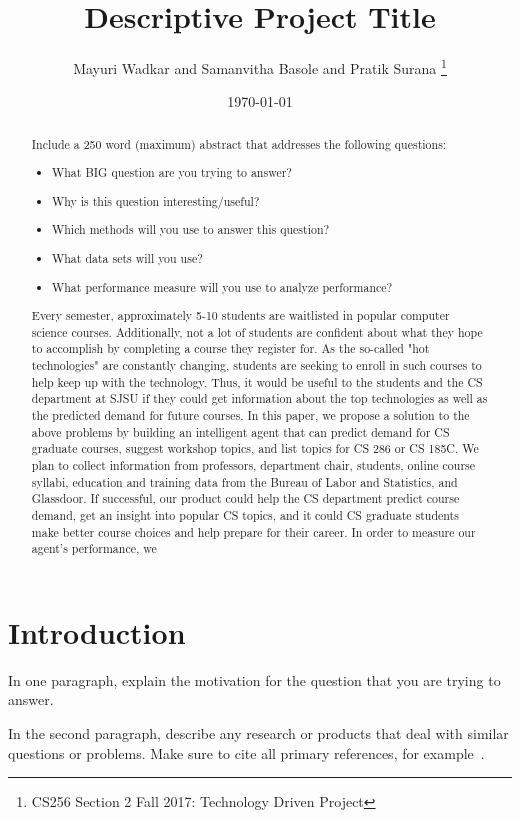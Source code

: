 \documentclass{article}
\title{Descriptive Project Title}
\author{Mayuri Wadkar and Samanvitha Basole and Pratik Surana
\thanks{CS256 Section 2 Fall 2017: Technology Driven Project}}
\date{\today}
\begin{document}
\maketitle

\begin{abstract}
Include a 250 word (maximum) abstract that addresses the following questions:
\begin{itemize}
\item What BIG question are you trying to answer?
\item Why is this question interesting/useful?
\item Which methods will you use to answer this question?
\item What data sets will you use?
\item What performance measure will you use to analyze performance?
\end{itemize}
Every semester, approximately 5-10 students are waitlisted in popular computer science courses. 
Additionally, not a lot of students are confident about what they hope to accomplish by completing a course they register for. As the so-called "hot technologies" are constantly changing, students are seeking to enroll in such courses to help keep up with the technology. Thus, it would be useful to the students and the CS department at SJSU if they could get information about the top technologies as well as the predicted demand for future courses. In this paper, we propose a solution to the above problems by building an intelligent agent that can predict demand for CS graduate courses, suggest workshop topics, and list topics for CS 286 or CS 185C. We plan to collect information from professors, department chair, students, online course syllabi, education and training data from the Bureau of Labor and Statistics, and Glassdoor. If successful, our product could help the CS department predict course demand, get an insight into popular CS topics, and it could CS graduate students make better course choices and help prepare for their career. In order to measure our agent's performance, we 
\end{abstract}

\section{Introduction}

In one paragraph, explain the motivation for the question that you are trying to answer. 

In the second paragraph, describe any research or products that deal with similar questions or problems.  Make sure to cite all primary references, for example~\cite{einstein}.
\end{document}
